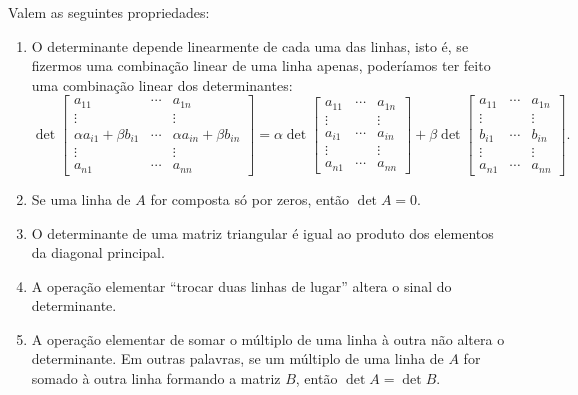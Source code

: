 \begin{teo}\label{thm:prop-det}
Valem as seguintes propriedades:
\begin{enumerate}[$(i)$]
\item O determinante depende linearmente de cada uma das linhas, isto é, se fizermos uma combinação linear de uma linha apenas, poderíamos ter feito uma combinação linear dos determinantes:
\begin{equation}
\det \begin{bmatrix}
a_{11} & \cdots & a_{1n} \\
\vdots &  & \vdots \\
\alpha a_{i1} + \beta b_{i1}  & \cdots & \alpha a_{in} + \beta b_{in} \\
\vdots &  & \vdots \\
a_{n1} & \cdots & a_{nn}
\end{bmatrix} =
\alpha \det \begin{bmatrix}
a_{11} & \cdots & a_{1n} \\
\vdots &  & \vdots \\
a_{i1} & \cdots & a_{in} \\
\vdots &  & \vdots \\
a_{n1} & \cdots & a_{nn}
\end{bmatrix} + \beta
\det \begin{bmatrix}
a_{11} & \cdots & a_{1n} \\
\vdots &  & \vdots \\
b_{i1} & \cdots & b_{in} \\
\vdots &  & \vdots \\
a_{n1} & \cdots & a_{nn}
\end{bmatrix}.
\end{equation}

\item Se uma linha de $A$ for composta só por zeros, então $\det A = 0$.

\item O determinante de uma matriz triangular é igual ao produto dos elementos da diagonal principal.

\item A operação elementar ``trocar duas linhas de lugar'' altera o sinal do determinante.

\item A operação elementar de somar o múltiplo de uma linha à outra não altera o determinante. Em outras palavras, se um múltiplo de uma linha de $A$ for somado à outra linha formando a matriz $B$, então $\det A = \det B$.


\end{enumerate}
\end{teo}
